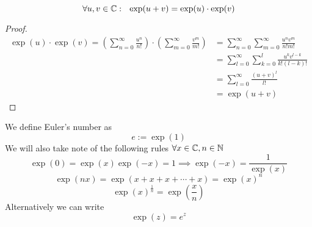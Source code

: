 \documentclass[../../script.tex]{subfiles}
\begin{document}
\begin{thm}
\[
	\forall u, v \in \mathbb{C}: ~~\exp(u+v) = \exp(u)\cdot\exp(v)
\]
\end{thm}
\begin{proof}
\begin{equation}
\begin{split}
	\exp(u)\cdot\exp(v) = \left(\sum_{n=0}^{\infty} \frac{u^n}{n!} \right) \cdot \left(\sum_{m=0}^{\infty} \frac{v^m}{m!} \right) &= \sum_{n=0}^{\infty} \sum_{m=0}^{\infty} \frac{u^nv^m}{n!m!} \\
	&= \sum_{l=0}^{\infty} \sum_{k=0}^{l} \frac{u^kv^{l-k}}{k!(l-k)!} \\
	&=\sum_{l=0}^{\infty} \frac{(u+v)^l}{l!} \\
	&= \exp(u+v)
\end{split}
\end{equation}
\end{proof}

\begin{rem}
We define Euler's number as
\[
	e := \exp(1)
\]
We will also take note of the following rules $\forall x \in \mathbb{C}, n \in \mathbb{N}$
\[
	\exp(0) = \exp(x)\exp(-x) = 1 \implies \exp(-x) = \frac{1}{\exp(x)} 
\]
\[
	\exp(nx) = \exp(x + x + x + \cdots + x) = \exp(x)^n
\]
\[
	\exp(x)^{\frac{1}{n}} = \exp(\frac{x}{n})
\]
Alternatively we can write
\[
	\exp(z) = e^z
\]
\end{rem}
\end{document}
